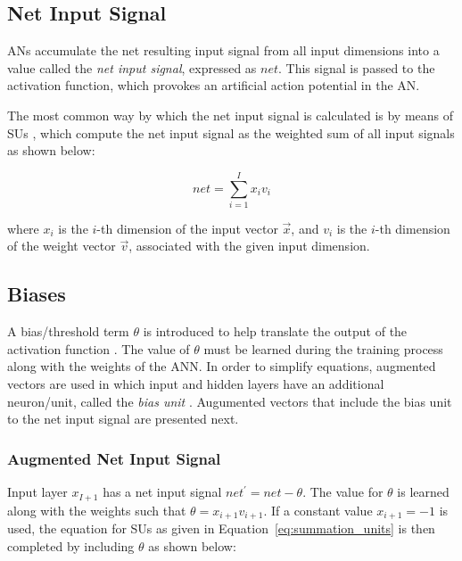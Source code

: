 \subsection{Net Input Signal}
\label{sec:anns:an:net_input}

\acp{AN} accumulate the net resulting input signal from all input dimensions
into a value called the \textit{net input signal},
expressed as $net$. This signal is passed to the activation function, which provokes an artificial action potential in
the \ac{AN}.

The most common way by which the net input signal is
calculated is by means of \acp{SU} \cite{ref:engelbrecht:2007}, which
compute the net input signal as the weighted sum of all
input signals as shown below:

\begin{equation}
    net = \sum_{i=1}^{I}{x_{i}v_{i}}
    \label{eq:summation_units}
\end{equation}

\noindent where $x_{i}$ is the $i$-th
dimension of the input vector $\vec{x}$, and $v_{i}$ is the $i$-th dimension of
the weight vector $\vec{v}$, associated with the given input dimension. 


\subsection{Biases}
\label{sec:anns:an:biases}

A bias/threshold term $\theta$ is introduced to help translate the output of the
activation function \cite{ref:benitez:1997}. The
value of $\theta$ must be learned during the training process along with the
weights of the \ac{ANN}. In order to simplify equations, augmented vectors are
used in which input and hidden layers have an additional neuron/unit, called the
\textit{bias unit} \cite{ref:engelbrecht:2007}. Augumented vectors that include
the bias unit to the net input signal are presented next.


\subsubsection{Augmented Net Input Signal}
\label{sec:anns:an:biases:augmented_net_input_signal}

Input layer $x_{I+1}$ has a net input signal $net^{'} = net - \theta$. The value
for $\theta$ is learned along with the weights such that $\theta =
x_{i+1}v_{i+1}$. If a constant value $x_{i+1} = -1$ is used, the equation for
\acp{SU} as given in Equation~\eqref{eq:summation_units} is then completed by
including $\theta$ as shown below:

